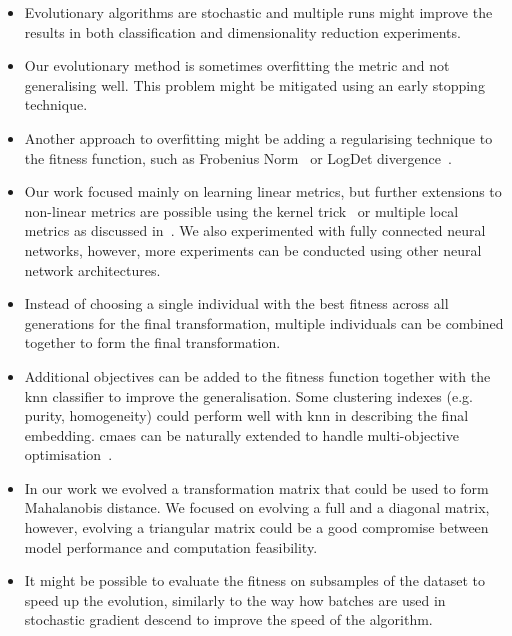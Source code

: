 \begin{itemize}
\item Evolutionary algorithms are stochastic and multiple runs might improve the results in both classification and dimensionality reduction experiments.

\item Our evolutionary method is sometimes overfitting the metric and not generalising well. This problem might be mitigated using an early stopping technique.

\item Another approach to overfitting might be adding a regularising technique to the fitness function, such as Frobenius Norm~\citep{schultz2003learning} or LogDet divergence~\citep{davis2007information}.

\item Our work focused mainly on learning linear metrics, but further extensions to non-linear metrics are possible using the kernel trick~\citep{chatpatanasiri2010new} or multiple local metrics as discussed in~\citep{bellet2013survey}. We also experimented with fully connected neural networks, however, more experiments can be conducted using other neural network architectures.

\item Instead of choosing a single individual with the best fitness across all generations for the final transformation, multiple individuals can be combined together to form the final transformation.

\item Additional objectives can be added to the fitness function together with the \ac{knn} classifier to improve the generalisation. Some clustering indexes (e.g. purity, homogeneity) could perform well with \ac{knn} in describing the final embedding. \ac{cmaes} can be naturally extended to handle multi-objective optimisation~\citep{igel2007covariance}.

\item In our work we evolved a transformation matrix that could be used to form Mahalanobis distance. We focused on evolving a full and a diagonal matrix, however, evolving a triangular matrix could be a good compromise between model performance and computation feasibility.

\item It might be possible to evaluate the fitness on subsamples of the dataset to speed up the evolution, similarly to the way how batches are used in stochastic gradient descend to improve the speed of the algorithm.
\end{itemize}

